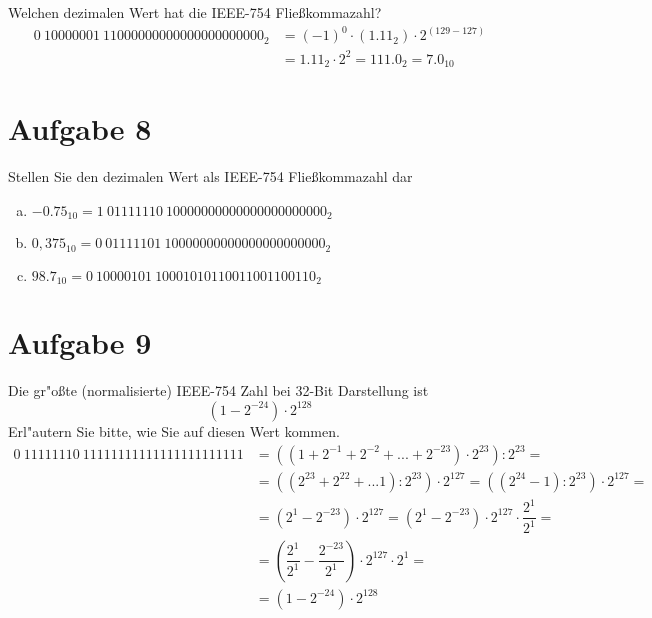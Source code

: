 \documentclass[10pt, oneside]{article}
\begin{document}
Welchen dezimalen Wert hat die IEEE-754 Flie{\ss}kommazahl?
\begin{align*}
    0\ 10000001\ 11000000000000000000000_2 &= (-1)^0 \cdot (1.11_2) \cdot 2^{(129 - 127)} \\
                                           &= 1.11_2 \cdot 2^{2} = 111.0_2 = 7.0_{10}
\end{align*}

\section{Aufgabe 8}

Stellen Sie den dezimalen Wert als IEEE-754 Fließkommazahl dar
\begin{enumerate}[(a)]
    \item $-0.75_{10} = 1\ 01111110\ 10000000000000000000000_2$
    \item $0,375_{10} = 0\ 01111101\ 10000000000000000000000_2$
    \item $98.7_{10} =  0\ 10000101\ 10001010110011001100110_2$
\end{enumerate}

\section{Aufgabe 9}

Die gr"o{\ss}te (normalisierte) IEEE-754 Zahl bei 32-Bit Darstellung ist
\begin{equation*}
    (1 - 2^{-24}) \cdot 2^{128}
\end{equation*}
Erl"autern Sie bitte, wie Sie auf diesen Wert kommen.
\begin{align*}
    0\ 11111110\ 11111111111111111111111 &= ((1 + 2^{-1} + 2^{-2} + ... + 2^{-23}) \cdot 2^{23}) : 2^{23} = \\
                                         &= ((2^{23} + 2^{22} + ... 1) : 2^{23}) \cdot 2^{127} = ((2^{24} - 1) : 2^{23}) \cdot 2^{127} = \\
                                         &= (2^1 - 2^{-23}) \cdot 2^{127} = (2^1 - 2^{-23}) \cdot 2^{127} \cdot \dfrac{2^{1}}{2^{1}} = \\
                                         &= (\dfrac{2^1}{2^1} - \dfrac{2^{-23}}{2^1}) \cdot 2^{127} \cdot 2^1 = \\[5pt]
                                         &= (1 - 2^{-24}) \cdot 2^{128}
\end{align*}
\end{document}
